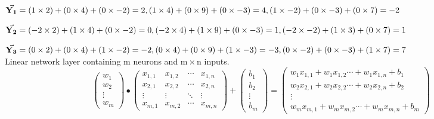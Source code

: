 \documentclass[11pt,a4paper]{article}
\begin{document}
$
\vec{\mathbf{Y_1}} =\\
( 1 \times 2) + (0 \times 4) + (0 \times -2) = 2,\\
( 1 \times 4) + (0 \times 9) + (0 \times -3) = 4,\\
( 1 \times -2) + (0 \times -3) + (0 \times 7) = -2
$

$
\vec{\mathbf{Y_2}} =\\
(-2 \times 2) + (1 \times 4) + (0 \times -2) = 0,\\
(-2 \times 4) + (1 \times 9) + (0 \times -3) = 1,\\
(-2 \times -2) + (1 \times 3) + (0 \times 7) = 1
$

$
\vec{\mathbf{Y_3}} =\\
( 0 \times 2) + (0 \times 4) + (1 \times -2) = -2,\\
( 0 \times 4) + (0 \times 9) + (1 \times -3) = -3,\\
( 0 \times -2) + (0 \times -3) + (1 \times 7) = 7
$
\\[11pt]
Linear network layer containing $\mathrm{m}$ neurons and $\mathrm{m} \times \mathrm{n}$ inputs.\\[11pt]
\[
\begin{pmatrix}
  w_{1} \\ %
  w_{2} \\ %
  \vdots \\ %
  w_{m} %
\end{pmatrix}
\bullet
\begin{pmatrix}
  x_{1,1} & x_{1,2} & \cdots & x_{1,n} \\
  x_{2,1} & x_{2,2} & \cdots & x_{2,n} \\
  \vdots & \vdots & \ddots & \vdots \\
  x_{m,1} & x_{m,2} & \cdots & x_{m,n}
\end{pmatrix}
+
\begin{pmatrix}
  b_{1} \\ %
  b_{2} \\ %
  \vdots \\ %
  b_{m} %
\end{pmatrix}
=
\begin{pmatrix}
  w_{1}x_{1,1}+w_{1}x_{1,2}\cdots + w_{1}x_{1,n}+b_{1}\\
  w_{2}x_{2,1}+w_{2}x_{2,2}\cdots + w_{2}x_{2,n}+b_{2}\\
  \vdots \\
  w_{m}x_{m,1}+w_{m}x_{m,2}\cdots + w_{m}x_{m,n}+b_{m}
\end{pmatrix}
\]
\end{document}
